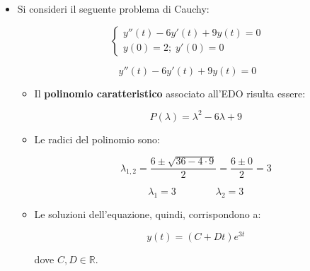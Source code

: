 \documentclass[a4paper, 12pt]{report}
\begin{document}
\begin{itemize}
\begin{itemize}
            $$ 
            \left \{ \begin{array}{l}
                C = -D \\
                2 = D-5D = -4D
            \end{array}\right .
            \qquad \Longrightarrow \qquad
            \left \{ \begin{array}{l}
                C = +\frac{1}{2} \\
                D = -\frac{1}{2}
            \end{array}\right .
            $$
            
            \item Dunque, l'unica soluzione del problema risulta essere:
            
            \[ y(t) = \frac{1}{2}e^{-t}-\frac{1}{2}e^{-5t}\]
        \end{itemize}
        
        \quad
        
        \item Si consideri il seguente problema di Cauchy:
        
        $$ 
        \left \{ \begin{array}{l}
            y''(t)-6y'(t)+9y(t)=0 \\
            y(0)=2; \; y'(0)=0
        \end{array}\right .
        $$
            
        \[ y''(t)-6y'(t)+9y(t)=0\]
        
        \begin{itemize}
            \item Il \textbf{polinomio caratteristico} associato all'EDO risulta essere:
            
            \[ P(\lambda) = \lambda^2-6\lambda+9\]
            
            \item Le radici del polinomio sono:
            
            \[ \lambda_{1,2} = \frac{6 \pm  \sqrt{36-4 \cdot 9}}{2} = \frac{6 \pm 0}{2} = 3\]
            
            \[ \lambda_1 = 3 \qquad\qquad \lambda_2 = 3\]
            
            \item Le soluzioni dell'equazione, quindi, corrispondono a:
            
            \[ y(t) = (C+Dt)e^{3t}\]
            
            dove $C, D \in \mathbb{R}$.
            

\end{itemize}
\end{itemize}
\end{document}
